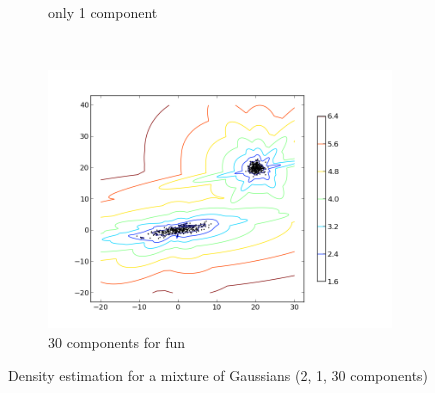 \documentclass{article}
\begin{document}
\begin{figure}
\begin{subfigure}[h]{0.3\textwidth}
                    \caption{only 1 component}
                    \label{fig:comp1}
            \end{subfigure}
            ~ %
            \begin{subfigure}[h]{0.3\textwidth}
                    \centering
                    \includegraphics[width=\textwidth]{gmm_comp30.png}
                    \caption{30 components for fun}
                    \label{fig:comp30}
            \end{subfigure}
            \caption{Density estimation for a mixture of Gaussians (2, 1, 30 components)}\label{fig:GMMex}
    \end{figure}
\end{document}
